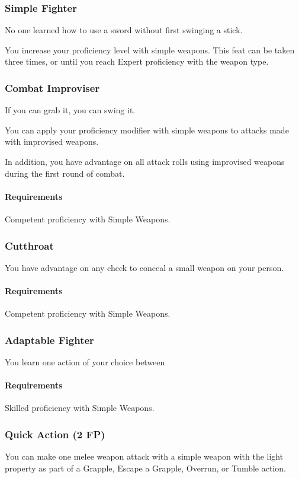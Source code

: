 \subsubsection{Simple Fighter} \label{feat::simplefighter}
    No one learned how to use a sword without first swinging a stick.

    You increase your proficiency level with simple weapons.
    This feat can be taken three times, or until you reach Expert proficiency with the weapon type.
\subsubsection{Combat Improviser} \label{feat::combatimproviser}
    If you can grab it, you can swing it.

    You can apply your proficiency modifier with simple weapons to attacks made with improvised weapons.

    In addition, you have advantage on all attack rolls using improvised weapons during the first round of combat.
    \paragraph{Requirements} Competent proficiency with Simple Weapons.
\subsubsection{Cutthroat} \label{feat::cutthroat}
    You have advantage on any check to conceal a small weapon on your person.
    \paragraph{Requirements} Competent proficiency with Simple Weapons.
\subsubsection{Adaptable Fighter} \label{feat::adaptablefighter}
    You learn one action of your choice between %
    \paragraph{Requirements} Skilled proficiency with Simple Weapons.
\subsubsection{Quick Action (2 FP)} \label{feat::quickaction}
    You can make one melee weapon attack with a simple weapon with the light property as part of a Grapple, Escape a Grapple, Overrun, or Tumble action.


